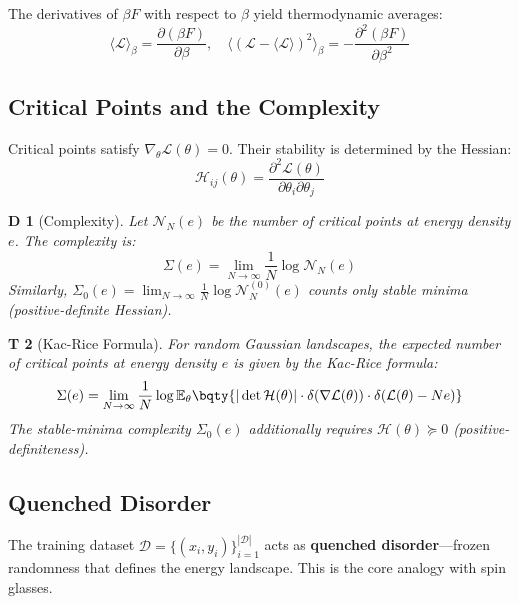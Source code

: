 \documentclass[12pt,a4paper]{article}
\newtheorem{theorem}Theorem[section]
\newtheorem{definition}[theorem]Definition
\newcommand{\E}{\mathbb{E}}
\newcommand{\D}{\mathcal{D}}
\newcommand{\loss}{\mathcal{L}}
\newcommand{\avg}[1]{\langle #1 \rangle}
\begin{document}
The derivatives of \(\beta F\) with respect to \(\beta\) yield thermodynamic averages:
\begin{equation}
\avg{\loss}_\beta = \frac{\partial (\beta F)}{\partial \beta}, \quad \avg{(\loss - \avg{\loss})^2}_\beta = -\frac{\partial^2 (\beta F)}{\partial \beta^2}
\end{equation}

\subsection{Critical Points and the Complexity}
Critical points satisfy \(\nabla_\theta \loss(\theta) = 0\). Their stability is determined by the Hessian:
\begin{equation}
\mathcal{H}_{ij}(\theta) = \frac{\partial^2 \loss(\theta)}{\partial \theta_i \partial \theta_j}
\end{equation}

\begin{definition}[Complexity]
Let \(\mathcal{N}_N(e)\) be the number of critical points at energy density \(e\). The complexity is:
\begin{equation}\label{eq:complexity}
\Sigma(e) = \lim_{N \to \infty} \frac{1}{N} \log \mathcal{N}_N(e)
\end{equation}
Similarly, \(\Sigma_0(e) = \lim_{N\to\infty} \frac{1}{N}\log \mathcal{N}_N^{(0)}(e)\) counts only stable minima (positive-definite Hessian).
\end{definition}

\begin{theorem}[Kac-Rice Formula]\label{thm:kac_rice}
For random Gaussian landscapes, the expected number of critical points at energy density \(e\) is given by the Kac-Rice formula:
\begin{equation}\label{eq:kac_rice}
\Sigma(e) = \lim_{N\to\infty} \frac{1}{N} \log \E_\theta\bqty{|\det \mathcal{H}(\theta)| \cdot \delta(\nabla \loss(\theta)) \cdot \delta(\loss(\theta) - N e)}
\end{equation}
The stable-minima complexity \(\Sigma_0(e)\) additionally requires \(\mathcal{H}(\theta) \succeq 0\) (positive-definiteness).
\end{theorem}

\subsection{Quenched Disorder}
The training dataset \(\D = \{(x_i, y_i)\}_{i=1}^{|\D|}\) acts as \textbf{quenched disorder}---frozen randomness that defines the energy landscape. This is the core analogy with spin glasses.
\end{document}

